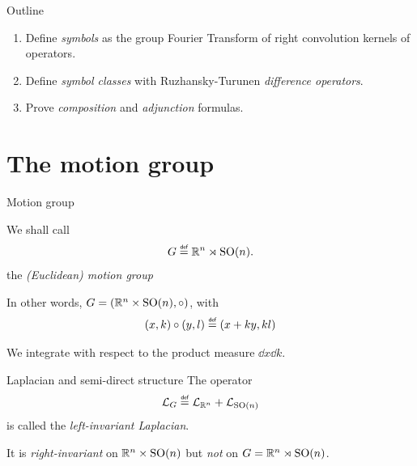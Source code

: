 \documentclass{beamer}
\begin{document}
\begin{frame}{Outline}
    \begin{enumerate}
        \item Define \emph{symbols} as the group Fourier Transform of right convolution kernels of operators.
            \pause
        \item Define \emph{symbol classes} with Ruzhansky-Turunen \emph{difference operators}.
            \pause
        \item Prove \emph{composition} and \emph{adjunction} formulas.
    \end{enumerate}
\end{frame}

\section{The motion group}

\begin{frame}{Motion group}
    \begin{definition}
        We shall call
        \begin{align*}
            \Group \defeq \R^n \rtimes \SpecialOrthogonalGroup n.
        \end{align*}
        the \emph{(Euclidean) motion group}
    \end{definition}

    \pause

    In other words, $G = (\mathbb{R}^n \times {\mathrm{SO} (n)}, \circ)$,
    with
    \begin{align*}
        (x, k) \circ (y, l) \defeq (x + k y, k l)
    \end{align*}

    \pause

    We integrate with respect to the product measure $\dd x \dd k$.
\end{frame}

\begin{frame}{Laplacian and semi-direct structure}
    The operator
    \begin{align*}
        \Laplacian \defeq \Laplacian [\R^n] + \Laplacian [\SpecialOrthogonalGroup n]
    \end{align*}
    is called the \emph{left-invariant Laplacian}.

    \pause

    It is \emph{right-invariant} on $\mathbb{R}^n \times {\mathrm{SO} (n)}$
    but \emph{not} on $G = \mathbb{R}^n \rtimes {\mathrm{SO} (n)}$.
\end{frame}
\end{document}
